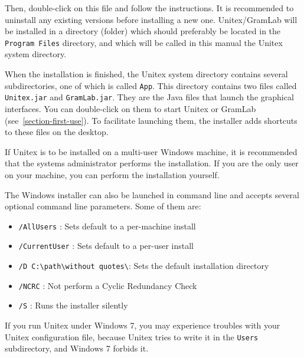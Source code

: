 \noindent Then, double-click on this file and follow the instructions. It is recommended to uninstall any
existing versions before installing a new one. Unitex/GramLab will be installed in a directory
(folder) which should preferably be located in the \verb+Program Files+
directory, and which will be called in this manual the Unitex system directory.

\bigskip
\noindent When the installation is finished, the Unitex system directory
contains several subdirectories,  one  of which is called \verb+App+. This directory contains two
files called \verb+Unitex.jar+ and \verb+GramLab.jar+. They
are the Java files that launch the graphical interfaces. You can double-click on them to start
Unitex or GramLab (see~\ref{section-first-use}). To facilitate launching them, the installer adds shortcuts to these files on the desktop.

\bigskip
\noindent If Unitex is to be installed on a multi-user Windows machine, it is recommended
that the systems administrator performs the installation. If you are the only
user on your machine, you can perform the installation yourself.

\bigskip
\begin{samepage}
\noindent The Windows installer can also be launched in command line and accepts several optional
command line parameters. Some of them are:

\begin{itemize}
\itemsep1pt\parskip0pt
\item
  \texttt{/AllUsers} : Sets default to a per-machine install\\
\item
  \texttt{/CurrentUser} : Sets default to a per-user install\\
\item
  \texttt{/D C:\textbackslash{}path\textbackslash{}without quotes\textbackslash{}}:
  Sets the default installation directory\\
\item
  \texttt{/NCRC} : Not perform a Cyclic Redundancy Check\\
\item
  \texttt{/S} : Runs the installer silently
\end{itemize}
\end{samepage}

\bigskip
\noindent If you run Unitex under Windows 7, you may experience troubles with your Unitex configuration
file, because Unitex tries to write it in the \verb+Users+ subdirectory, and Windows 7 forbids it.

